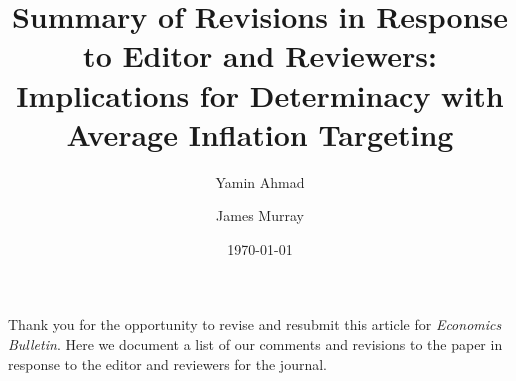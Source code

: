 \documentclass[english,authoryear,12pt]{elsarticle}
\def\baselinestretch{1}%
\def\baselinestretch{1}%
\gdef\thefootnote{\arabic{footnote}}%
\begin{document}
	\begin{frontmatter}
		\title{Summary of Revisions in Response to Editor and Reviewers: Implications for Determinacy with Average Inflation Targeting}
		\date{\today}
		\author[1]{Yamin Ahmad }
		\author[2]{James Murray}

		\address[1]{Dept. of Economics, University of Wisconsin - Whitewater, 809 W. Starin Road, Whitewater, WI 53190, USA}
		\address[2]{Dept. of Economics, University of Wisconsin - La Crosse, 1725 State St., La Crosse, WI 54601, USA}

\end{frontmatter}

\renewcommand{\thefootnote}{\arabic{footnote}}%
\setcounter{page}{1}%
\setcounter{footnote}{0}%

Thank you for the opportunity to revise and resubmit this article for \textit{Economics Bulletin}. Here we document a list of our comments and revisions to the paper in response to the editor and reviewers for the journal.
\end{document}
